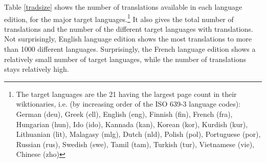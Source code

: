 \documentclass[sw]{iosart2c}
\begin{document}
Table \ref{tradsize} shows the number of translations available in each language edition, for the major target languages.\footnote{The target languages are the 21 having the largest page count in their wiktionaries, i.e. (by increasing order of the ISO 639-3 language codes):
German (deu),
Greek (ell),
English (eng),
Finnish (fin),
French (fra),
Hungarian (hun),
Ido (ido),
Kannada (kan),
Korean (kor),
Kurdish (kur),
Lithuanian (lit),
Malagasy (mlg),
Dutch (nld),
Polish (pol),
Portuguese (por),
Russian (rus),
Swedish (swe),
Tamil (tam),
Turkish (tur),
Vietnamese (vie),
Chinese (zho)
} It also gives the total number of translations and the number of the different target languages with translations. Not surprisingly, English language edition shows the most translations to more than 1000 different languages. Surprisingly, the French language edition shows a relatively small number of target languages, while the number of translations stays relatively high. 
\end{document}

